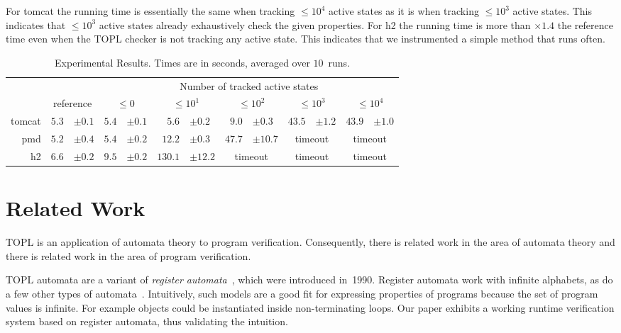 \documentclass[9pt, preprint]{sigplanconf} %
\theoremstyle{definition}
\theoremstyle{remark}
\begin{document}
For tomcat the running time is essentially the same when tracking $\le10^4$ active states as it is when tracking $\le10^3$ active states.
This indicates that $\le10^3$ active states already exhaustively check the given properties.
For h2 the running time is more than $\times1.4$ the reference time even when the TOPL checker is not tracking any active state.
This indicates that we instrumented a simple method that runs often.

\begin{table*}[t]\centering
\begin{tabular}{@{}rr@{}lr@{}lr@{}lr@{}lr@{}lr@{}l}
  &&
  & \multicolumn{10}{c}{Number of tracked active states} \\ \cmidrule{4-13}
& \multicolumn{2}{c}{reference}
  &\multicolumn{2}{c}{$\le0$}
  &\multicolumn{2}{c}{$\le10^1$}
  &\multicolumn{2}{c}{$\le10^2$}
  &\multicolumn{2}{c}{$\le10^3$}
  &\multicolumn{2}{c}{$\le10^4$} \\ \midrule
tomcat
  & $5.3$ & $\pm0.1$
  & $5.4$ & $\pm0.1$
  & $5.6$ & $\pm0.2$
  & $9.0$ & $\pm0.3$
  & $43.5$ & $\pm1.2$
  & $43.9$ & $\pm1.0$ \\
pmd
  & $5.2$ & $\pm0.4$
  & $5.4$ & $\pm0.2$
  & $12.2$ & $\pm0.3$
  & $47.7$ & $\pm10.7$
  & \multicolumn{2}{c}{timeout}
  & \multicolumn{2}{c}{timeout}
  \\
h2
  & $6.6$ & $\pm0.2$
  & $9.5$ & $\pm0.2$
  & $130.1$ & $\pm12.2$
  & \multicolumn{2}{c}{timeout}
  & \multicolumn{2}{c}{timeout}
  & \multicolumn{2}{c}{timeout}
  \\
\end{tabular}
\caption{
  Experimental Results.
  Times are in seconds, averaged over $10$~runs.
}\label{table:overhead}
\end{table*}

\section{Related Work}\label{sec:related} %

TOPL is an application of automata theory to program verification.
Consequently, there is related work in the area of automata theory and there is related work in the area of program verification.

TOPL automata are a variant of {\it register automata\/}~\cite{dblp:conf/focs/kaminskif90}, which were introduced in~1990.
Register automata work with infinite alphabets, as do a few other types of automata~\cite{dblp:conf/csl/segoufin06}.
Intuitively, such models are a good fit for expressing properties of programs because the set of program values is infinite.
For example objects could be instantiated inside non-terminating loops.
Our paper exhibits a working runtime verification system based on register automata, thus validating the intuition.
\end{document}
